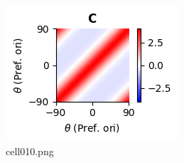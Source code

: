 \begin{figure}[ht]
	\centering
	\includegraphics[scale=0.8, max width=\linewidth]{./fig/bayesian-brain/neural-sampling/cell010.png}
	\caption{cell010.png}
	\label{cell010.png}
\end{figure}